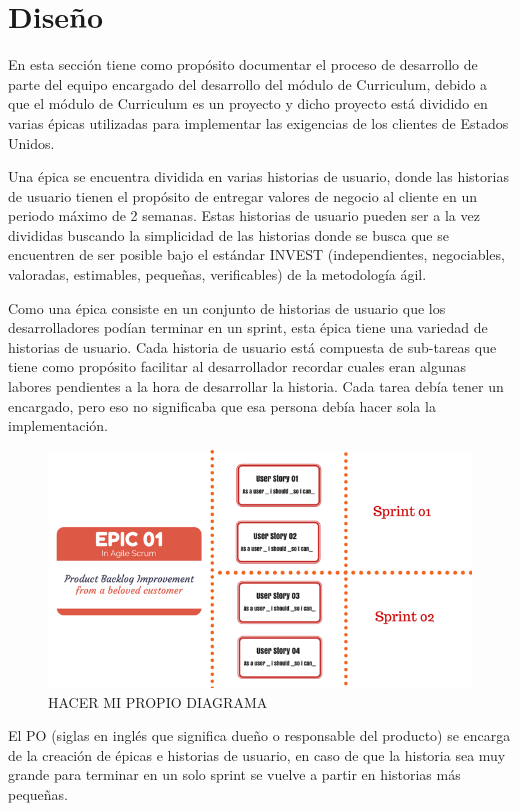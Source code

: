 \section{Diseño}
En esta sección tiene como propósito documentar el proceso de desarrollo de parte del equipo encargado del desarrollo del módulo de Curriculum, debido a que el módulo de Curriculum es un proyecto y dicho proyecto está dividido en varias épicas utilizadas para implementar las exigencias de los clientes de Estados Unidos.

Una épica se encuentra dividida en varias historias de usuario, donde las historias de usuario tienen el propósito de entregar valores de negocio al cliente en un periodo máximo de 2 semanas. Estas historias de usuario pueden ser a la vez divididas buscando la simplicidad de las historias donde se busca que se encuentren de ser posible bajo el estándar INVEST (independientes, negociables, valoradas, estimables, pequeñas, verificables) de la metodología ágil.

Como una épica consiste en un conjunto de historias de usuario que los desarrolladores podían terminar en un sprint, esta épica tiene una variedad de historias de usuario. Cada historia de usuario está compuesta de sub-tareas que tiene como propósito facilitar al desarrollador recordar cuales eran algunas labores pendientes a la hora de desarrollar la historia. Cada tarea debía tener un encargado, pero eso no significaba que esa persona debía hacer sola la implementación.

\begin{figure}[H]
\centering
\includegraphics[width=125mm,scale=1]{Figuras/proceso/epic}
\caption{HACER MI PROPIO DIAGRAMA}
  \label{epic}
\end{figure}

El PO (siglas en inglés que significa dueño o responsable del producto) se encarga de la creación de épicas e historias de usuario, en caso de que la historia sea muy grande para terminar en un solo sprint se vuelve a partir en historias más pequeñas. 

